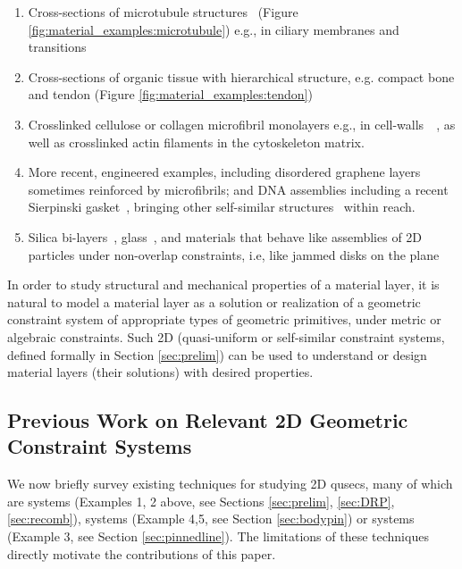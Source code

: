 \begin{enumerate}
    \item Cross-sections of microtubule structures~\cite{microtubule_necklace} (Figure \ref{fig:material_examples:microtubule}) e.g., in ciliary membranes and transitions~\cite{microtubule_cilia}

    \item Cross-sections of organic tissue with hierarchical structure, e.g. compact bone and tendon (Figure \ref{fig:material_examples:tendon}) \uncited

    \item Crosslinked cellulose or collagen microfibril monolayers e.g., in cell-walls~\cite{CellWalls1}~\cite{CellWalls1}, as well as crosslinked actin filaments in the cytoskeleton matrix.

    \item More recent, engineered examples, including disordered
    graphene layers~\cite{Graphene1}~\cite{Graphene2} sometimes
    reinforced by microfibrils; and DNA assemblies including a recent
    Sierpinski gasket~\cite{self_assembly_sierpinski}, bringing other
    self-similar structures~\cite{Microfibrils2} within reach.

    \item Silica bi-layers~\cite{silica_bilayers}, glass~\cite{sructure_of_2d_glass}, and
    materials that behave like assemblies of 2D particles under
    non-overlap constraints, i.e, like jammed disks on the plane~\cite{jammed_disks}
\end{enumerate}
%
In order to study structural and mechanical properties
of a material layer, it is natural to model a material layer as a solution or
realization of a geometric constraint system of appropriate types of geometric
primitives, under metric or algebraic constraints. Such 2D
 (quasi-uniform or self-similar constraint systems, defined
formally in Section \ref{sec:prelim}) can be
used to understand or design material layers (their solutions) with
desired properties.
%
\subsection{Previous Work on Relevant 2D Geometric Constraint Systems}
We now briefly survey existing techniques for studying 2D
qusecs,  many of which are  systems
(Examples 1, 2 above, see Sections \ref{sec:prelim}, \ref{sec:DRP}, \ref{sec:recomb}),
 systems (Example 4,5, see Section
\ref{sec:bodypin}) or  systems (Example
3, see Section \ref{sec:pinnedline}). The limitations of these
techniques directly motivate the contributions of this paper.

